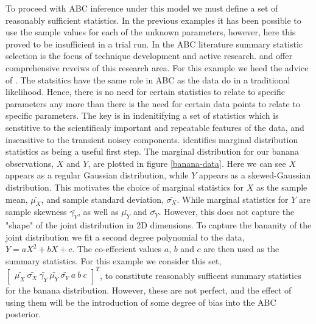 To proceed with ABC inference under this model we must define a set of reasonably sufficient statistics. In the previous examples it has been possible to use the sample values for each of the unknown parameters, however, here this proved to be insufficient in a trial run. In the ABC literature summary statistic selection is the focus of technique development and active research. \citet{Blum2013} and \citet{Prangle2017} offer comprehensive reveiws of this research area. For this example we heed the advice of \citet{Wood2010}. The statsitics have the same role in ABC as the data do in a traditional likelihood. Hence, there is no need for certain statistics to relate to specific parameters any more than there is the need for certain data points to relate to specific parameters. The key is in indenitifying a set of statistics which is senstitive to the scientificaly important and repeatable features of the data, and insensitive to the transient noisey components. \citet{Wood2010} identifies marginal distribution statistics as being a useful first step. The marginal distribution for our banana observations, $X$ and $Y$, are plotted in figure \ref{banana-data}. Here we can see $X$ appears as a regular Gaussian distribution, while $Y$ appears as a skewed-Gaussian distribution. This motivates the choice of marginal statistics for $X$ as the sample mean, $\bar{\mu_X}$, and sample standard deviation, $\bar{\sigma_X}$. While marginal statistics for $Y$ are sample skewness $\bar{\gamma_Y}$, as well as $\bar{\mu_Y}$ and $\bar{\sigma_Y}$. However, this does not capture the "shape" of the joint distribution in 2D dimensions. To capture the bananity of the joint distribution we fit a second degree polynomial to the data, $Y = aX^2 + bX + c$. The co-effecient values $a$, $b$ and $c$ are then used as the summary statistics. For this example we consider this set, $\begin{bmatrix}
\bar{\mu_X}\ \bar{\sigma_X}\ \bar{\gamma_Y}\ \bar{\mu_Y}\ \bar{\sigma_Y}\ a\ b\ c
\end{bmatrix}^T$, to constitute reasonably sufficent summary statistics for the banana distribution. However, these are not perfect, and the effect of using them will be the introduction of some degree of bias into the ABC posterior. \\



